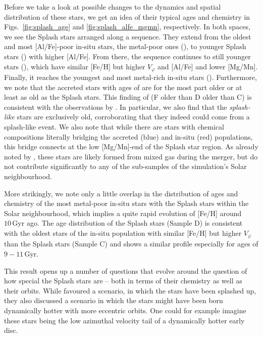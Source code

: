 \documentclass[fleqn,usenatbib]{mnras}
\begin{document}
Before we take a look at possible changes to the dynamics and spatial distribution of these stars, we get an idea of their typical ages and chemistry in Figs.~\ref{fig:splash_age} and \ref{fig:splash_alfe_mgmn}, respectively. In both spaces, we see the Splash stars arranged along a sequence. They extend from the oldest and most [Al/Fe]-poor in-situ stars, the metal-poor ones (), to younger Splash stars () with higher [Al/Fe]. From there, the sequence continues to still younger stars (), which have similar [Fe/H] but higher $V_\varphi$ and [Al/Fe] and lower [Mg/Mn]. Finally, it reaches the youngest and most metal-rich in-situ stars (). Furthermore, we note that the accreted stars with ages of  are for the most part older or at least as old as the Splash stars. This finding of (F older than D older than C) is consistent with the observations by \citet{Belokurov2020}. In particular, we also find that the \textit{splash-like} stars are exclusively old, corroborating that they indeed could come from a splash-like event. We also note that while there are stars with chemical compositions literally bridging the accreted (blue) and in-situ (red) populations, this bridge connects at the low [Mg/Mn]-end of the Splash star region. As already noted by \citet{Buder2024}, these stars are likely formed from mixed gas during the merger, but do not contribute significantly to any of the sub-samples of the simulation's Solar neighbourhood.

More strikingly, we note only a little overlap in the distribution of ages and chemistry of the most metal-poor in-situ stars with the Splash stars within the Solar neighbourhood, which implies a quite rapid evolution of [Fe/H] around $10\,\mathrm{Gyr}$ ago. The age distribution of the Splash stars (Sample D) is consistent with the oldest stars of the in-situ population with similar [Fe/H] but higher $V_\varphi$ than the Splash stars (Sample C) and shows a similar profile especially for ages of $9-11\,\mathrm{Gyr}$.

This result opens up a number of questions that evolve around the question of how special the Splash stars are -- both in terms of their chemistry as well as their orbits. While \citet{Belokurov2020} favoured a scenario, in which the stars have been splashed up, they also discussed a scenario in which the stars might have been born dynamically hotter with more eccentric orbits. One could for example imagine these stars being the low azimuthal velocity tail of a dynamically hotter early disc.
\end{document}
